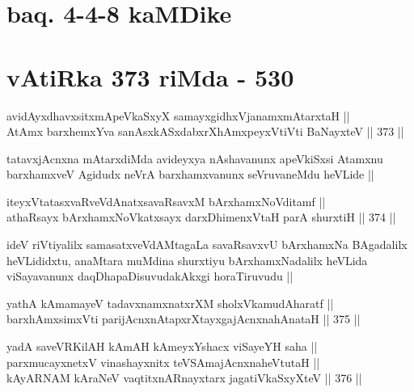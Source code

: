 \section*{baq. 4-4-8 kaMDike}

\section*{vAtiRka 373 riMda - 530}

\begin{shl}
avidAyxdhavxsitxmApeVkaSxyX samayxgidhxVjanamxmAtarxtaH || \\
AtAmx barxhemxYva sanAsxkASxdabxrXhAmxpeyxVtiVti BaNayxteV ||  373 ||  
\end{shl}

\begin{artha}
tatavxjAcnxna mAtarxdiMda avideyxya nAshavanunx apeVkiSxsi Atamxnu
barxhamxveV Agidudx neVrA barxhamxvanunx seVruvaneMdu heVLide ||
\end{artha}

\begin{shl}
iteyxVtatasxvaRveVdAnatxsavaRsavxM bArxhamxNoVditamf || \\
athaRsayx bArxhamxNoVkatxsayx darxDhimenxV\s taH parA shurxtiH ||  374 ||  
\end{shl}

\begin{artha}
ideV riVtiyalilx samasatxveVdAMtagaLa savaRsavxvU bArxhamxNa
BAgadalilx heVLididxtu, anaMtara muMdina shurxtiyu bArxhamxNadalilx
heVLida viSayavanunx daqDhapaDisuvudakAkxgi horaTiruvudu ||
\end{artha}

\begin{shl}
yathA kAmamayeV tadavxnamxnatxrXM sholxVkamudAharatf || \\
barxhAmxsimxVti parijAcnxnAtapxrXtayxgajAcnxnahAnataH ||  375 ||  
\end{shl}
				
\begin{shl}
yadA saveVR\s KilAH kAmAH kAmeyxYshacx viSayeYH saha || \\
parxmucayxnetxV vinashayxnitx teVSAmajAcnxnaheVtutaH || \\
kAyARNAM kAraNeV vaqtitxnARnayxtarx jagatiVkaSxyXteV ||  376 ||  
\end{shl}

